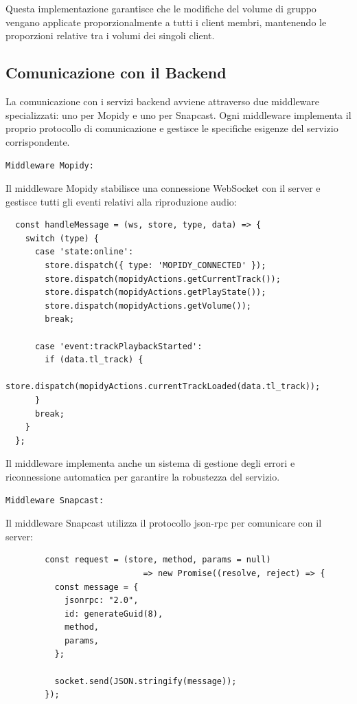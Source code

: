 Questa implementazione garantisce che le modifiche del volume di gruppo vengano applicate proporzionalmente a tutti i client membri, mantenendo le proporzioni relative tra i volumi dei singoli client.

\newpage
\subsection{Comunicazione con il Backend}

La comunicazione con i servizi backend avviene attraverso due middleware specializzati: uno per Mopidy e uno per Snapcast. Ogni middleware implementa il proprio protocollo di comunicazione e gestisce le specifiche esigenze del servizio corrispondente.

\texttt{Middleware Mopidy:}

Il middleware Mopidy stabilisce una connessione WebSocket con il server e gestisce tutti gli eventi relativi alla riproduzione audio:

\begin{table}[H]
  \begin{algorithm}[H]
    \caption{}
    \BlankLine
      \begin{verbatim}
  const handleMessage = (ws, store, type, data) => {
    switch (type) {
      case 'state:online':
        store.dispatch({ type: 'MOPIDY_CONNECTED' });
        store.dispatch(mopidyActions.getCurrentTrack());
        store.dispatch(mopidyActions.getPlayState());
        store.dispatch(mopidyActions.getVolume());
        break;
  
      case 'event:trackPlaybackStarted':
        if (data.tl_track) {
        store.dispatch(mopidyActions.currentTrackLoaded(data.tl_track));
      }
      break;
    }
  };
      \end{verbatim}
    \end{algorithm}
    \caption{}
    \label{tab:middleware_mopidy}
  \end{table}

Il middleware implementa anche un sistema di gestione degli errori e riconnessione automatica per garantire la robustezza del servizio.

\texttt{Middleware Snapcast:}

Il middleware Snapcast utilizza il protocollo \gls{json-rpc} per comunicare con il server:

\begin{table}[H]
  \begin{algorithm}[H]
    \caption{}
    \BlankLine
      \begin{verbatim}
        const request = (store, method, params = null) 
                            => new Promise((resolve, reject) => {
          const message = {
            jsonrpc: "2.0",
            id: generateGuid(8),
            method,
            params,
          };
  
          socket.send(JSON.stringify(message));
        });
      \end{verbatim}
    \end{algorithm}
    \caption{}
    \label{tab:request_function}
  \end{table}

